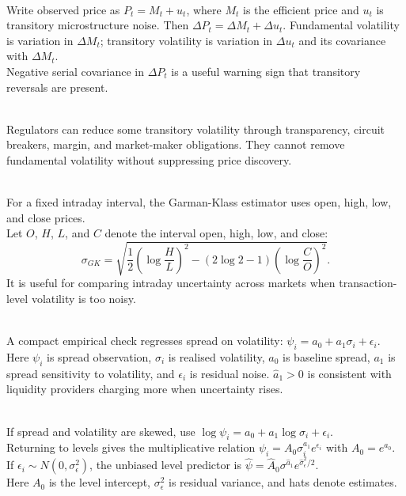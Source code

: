 \begin{model} \\
Write observed price as $P_t=M_t+u_t$, where $M_t$ is the efficient price and $u_t$ is transitory microstructure noise. Then $\Delta P_t=\Delta M_t+\Delta u_t$. Fundamental volatility is variation in $\Delta M_t$; transitory volatility is variation in $\Delta u_t$ and its covariance with $\Delta M_t$.\\
Negative serial covariance in $\Delta P_t$ is a useful warning sign that transitory reversals are present.
\end{model}

\begin{caveat} \\
Regulators can reduce some transitory volatility through transparency, circuit breakers, margin, and market-maker obligations. They cannot remove fundamental volatility without suppressing price discovery.
\end{caveat}

\begin{definition} \\
For a fixed intraday interval, the Garman-Klass estimator uses open, high, low, and close prices.\\
Let $O$, $H$, $L$, and $C$ denote the interval open, high, low, and close:
\begin{equation*}
\sigma_{GK}= \sqrt{\frac{1}{2}\left(\log\frac{H}{L}\right)^2-\left(2\log 2-1\right)\left(\log\frac{C}{O}\right)^2}.
\end{equation*}
It is useful for comparing intraday uncertainty across markets when transaction-level volatility is too noisy.
\end{definition}

\begin{model} \\
A compact empirical check regresses spread on volatility: $\psi_i=a_0+a_1\sigma_i+\epsilon_i$.\\
Here $\psi_i$ is spread observation, $\sigma_i$ is realised volatility, $a_0$ is baseline spread, $a_1$ is spread sensitivity to volatility, and $\epsilon_i$ is residual noise. $\hat{a}_1 > 0$ is consistent with liquidity providers charging more when uncertainty rises.
\end{model}

\begin{model} \\
If spread and volatility are skewed, use $\log \psi_i=a_0+a_1\log\sigma_i+\epsilon_i$.\\
Returning to levels gives the multiplicative relation $\psi_i=A_0\sigma_i^{a_1}e^{\epsilon_i}$ with $A_0=e^{a_0}$. If $\epsilon_i\sim N(0,\sigma_\epsilon^2)$, the unbiased level predictor is $\hat{\psi}= \hat{A}_0\sigma^{\hat{a}_1}e^{\hat{\sigma}_\epsilon^2/2}$.\\
Here $A_0$ is the level intercept, $\sigma_\epsilon^2$ is residual variance, and hats denote estimates.
\end{model}

